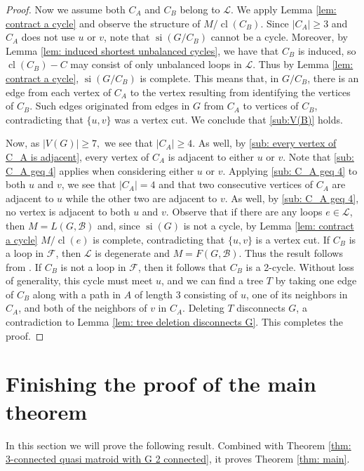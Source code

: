 \documentclass[12pt]{article}
\theoremstyle{definition}
\theoremstyle{plain} %
\newcommand{\cB}{\mathcal{B}}
\newcommand{\cF}{\mathcal{F}}
\newcommand{\cL}{\mathcal{L}}
\DeclareMathOperator{\si}{si}
\DeclareMathOperator{\cl}{cl}
\begin{document}
\begin{proof}
Now we assume both $C_A$ and $C_B$ belong to $\cL$. We apply Lemma \ref{lem: contract a cycle} and observe the structure of $M/\cl(C_B)$. Since $\lvert C_A\rvert\geq3$ and $C_A$ does not use $u$ or $v$, note that $\si(G/C_B)$ cannot be a cycle. Moreover, by Lemma \ref{lem: induced shortest unbalanced cycles}, we have that $C_B$ is induced, so $\cl(C_B)-C$ may consist of only unbalanced loops in $\cL$. Thus by Lemma \ref{lem: contract a cycle}, $\si(G/C_B)$ is complete. This means that, in $G/C_B$, there is an edge from each vertex of $C_A$ to the vertex resulting from identifying the vertices of $C_B$. Such edges originated from edges in $G$ from $C_A$ to vertices of $C_B$, contradicting that $\{u,v\}$ was a vertex cut. We conclude that \ref{sub:V(B)} holds.

Now, as $\lvert V(G)\rvert\geq7,$ we see that $\lvert C_A\rvert\geq4$. As well, by \ref{sub: every vertex of C_A is adjacent}, every vertex of $C_A$ is adjacent to either $u$ or $v$. Note that \ref{sub: C_A geq 4} applies when considering either $u$ or $v$. Applying \ref{sub: C_A geq 4} to both $u$ and $v$, we see that $\lvert C_A\rvert=4$ and that two consecutive vertices of $C_A$ are adjacent to $u$ while the other two are adjacent to $v$. As well, by \ref{sub: C_A geq 4}, no vertex is adjacent to both $u$ and $v$. Observe that if there are any loops $e\in\cL$, then $M=L(G,\cB)$ and, since $\si(G)$ is not a cycle, by Lemma \ref{lem: contract a cycle} $M/\cl(e)$ is complete, contradicting that $\{u,v\}$ is a vertex cut. If $C_B$ is a loop in $\cF$, then $\cL$ is degenerate and $M=F(G,\cB)$. Thus the result follows from \cite[Theorem 3.5]{Fife-Mayhew-Oxley-Semple2020}. If $C_B$ is not a loop in $\cF$, then it follows that $C_B$ is a 2-cycle. Without loss of generality, this cycle must meet $u$, and we can find a tree $T$ by taking one edge of $C_B$ along with a path in $A$ of length 3 consisting of $u$, one of its neighbors in $C_A$, and both of the neighbors of $v$ in $C_A$. Deleting $T$ disconnects $G$, a contradiction to Lemma \ref{lem: tree deletion disconnects G}. This completes the proof.  
\end{proof} 


\section{Finishing the proof of the main theorem} \label{sec: when G is 3-connected}

In this section we will prove the following result. Combined with Theorem \ref{thm: 3-connected quasi matroid with G 2 connected}, it proves Theorem \ref{thm: main}.
\end{document}
